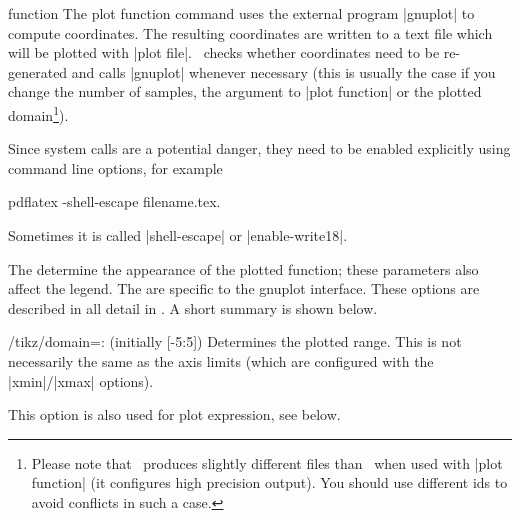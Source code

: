\begin{addplotoperation}[]{function}{}
The plot function command uses the external program |gnuplot| to compute coordinates. The resulting coordinates are written to a text file which will be plotted with |plot file|. \PGF\ checks whether coordinates need to be re-generated and calls |gnuplot| whenever necessary (this is usually the case if you change the number of samples, the argument to |plot function| or the plotted domain\footnote{Please note that \PGFPlots\ produces slightly different files than \Tikz\ when used with |plot function| (it configures high precision output). You should use different ids to avoid conflicts in such a case.}).

Since system calls are a potential danger, they need to be enabled explicitly using command line options, for example
\begin{codeexample}
pdflatex -shell-escape filename.tex.
\end{codeexample}
Sometimes it is called |shell-escape| or |enable-write18|.
\begin{codeexample}[]
\end{codeexample}

\begin{codeexample}[]
\end{codeexample}

The  determine the appearance of the plotted function; these parameters also affect the legend. The  are specific to the gnuplot interface. These options are described in all detail in \cite[section~18.6]{tikz}. A short summary is shown below.
\end{addplotoperation}

\begin{key}{/tikz/domain=: (initially [-5:5])}
	 Determines the plotted range. This is not necessarily the same as the axis limits (which are configured with the |xmin|/|xmax| options). 

	 This option is also used for plot expression, see below.
\end{key}

